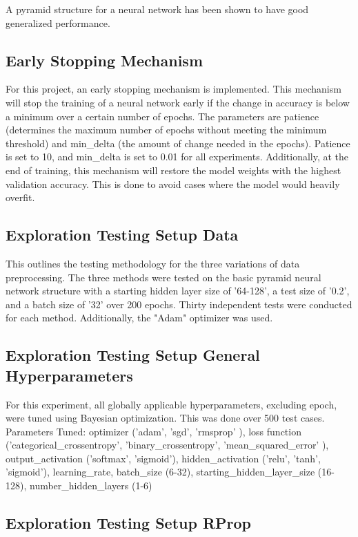 \documentclass[conference]{IEEEtran}
\begin{document}
A pyramid structure for a neural network has been shown to have good generalized performance. \cite{b1}

\subsection{Early Stopping Mechanism}

For this project, an early stopping mechanism is implemented. This mechanism will stop the training of a neural network early if the change in accuracy is below a minimum over a certain number of epochs. The parameters are patience (determines the maximum number of epochs without meeting the minimum threshold) and min\_delta (the amount of change needed in the epochs). Patience is set to 10, and min\_delta is set to 0.01 for all experiments. Additionally, at the end of training, this mechanism will restore the model weights with the highest validation accuracy. This is done to avoid cases where the model would heavily overfit.

\subsection{Exploration Testing Setup Data}

This outlines the testing methodology for the three variations of data preprocessing. The three methods were tested on the basic pyramid neural network structure with a starting hidden layer size of '64-128', a test size of '0.2', and a batch size of '32' over 200 epochs. Thirty independent tests were conducted for each method. Additionally, the "Adam" optimizer was used.

\subsection{Exploration Testing Setup General Hyperparameters}

For this experiment, all globally applicable hyperparameters, excluding epoch, were tuned using Bayesian optimization. This was done over 500 test cases.
Parameters Tuned: optimizer ('adam', 'sgd', 'rmsprop' ), loss function ('categorical\_crossentropy', 'binary\_crossentropy', 'mean\_squared\_error' ), output\_activation ('softmax', 'sigmoid'), hidden\_activation ('relu', 'tanh', 'sigmoid'), learning\_rate, batch\_size (6-32), starting\_hidden\_layer\_size (16-128), number\_hidden\_layers (1-6)

\subsection{Exploration Testing Setup RProp}
\end{document}
